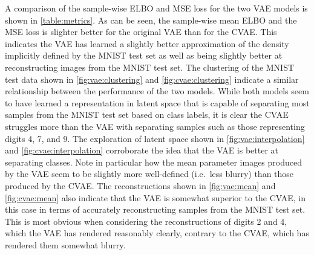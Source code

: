 A comparison of the sample-wise ELBO and MSE loss for the two VAE models is shown in \cref{table:metrics}. As can be seen,  the sample-wise mean ELBO and the MSE loss is slighter better for the original VAE than for the CVAE\@. This indicates the VAE has learned a slightly better approximation of the density implicitly defined by the MNIST test set as well as being slightly better at reconstructing images from the MNIST test set. The clustering of the MNIST test data shown in \cref{fig:vae:clustering} and \cref{fig:cvae:clustering} indicate a similar relationship between the performance of the two models. While both models seem to have learned a representation in latent space  that is capable of separating most samples from the MNIST test set based on class labels, it is clear the CVAE struggles more than the VAE with separating samples such as those representing digits 4, 7, and 9. The exploration of latent space shown in \cref{fig:vae:interpolation} and \cref{fig:cvae:interpolation} corroborate the idea that the VAE is better at separating classes. Note in particular how the mean parameter images produced by the VAE seem to be slightly more well-defined (i.e.\ less blurry) than those produced by the CVAE\@. The reconstructions shown in \cref{fig:vae:mean} and \cref{fig:cvae:mean} also indicate that the VAE is somewhat superior to the CVAE, in this case in terms of accurately reconstructing samples from the MNIST test set. This is most obvious when considering the reconstructions of digits 2 and 4, which the VAE has rendered reasonably clearly, contrary to the CVAE, which has rendered them somewhat blurry. 
\iffalse 
The reason why the CVAE slightly underperforms compared to the VAE is not entirely clear to us. In fact, one might expect the CVAE would perform better than the VAE, given that convolutional layers in general are better than linear layers at capturing complex spatial information in image data. One reason why the CVAE underperforms may be that the MNIST dataset is too simple and hence convolutional layers are not required to extract its most salient features. In particular, since MNIST digits are centered and of similar size, the convolutional layers might not be necessary. Its also possible that the CVAE is not deep enough to effectively learn a useful representation of the MNIST data, that the kernel size ($3\times3$) used by its layers is not large enough to capture spatial dependencies in the MNIST data or that a stride of $(2\times2)$ results in too significant a loss of information. 
\fi